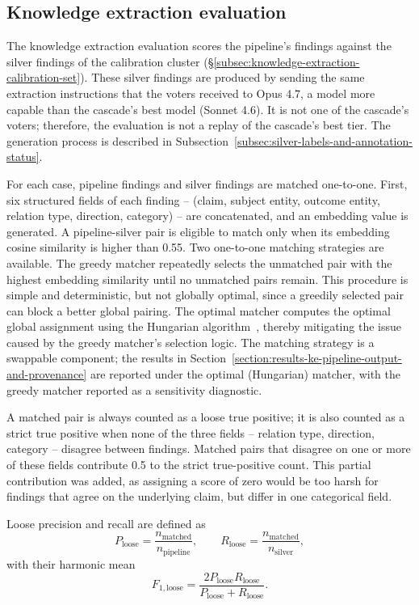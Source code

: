 \subsection{Knowledge extraction evaluation}\label{subsec:eval-knowledge-extraction}

The knowledge extraction evaluation scores the pipeline's findings against the silver findings of the calibration cluster (§\ref{subsec:knowledge-extraction-calibration-set}). These silver findings are produced by sending the same extraction instructions that the voters received to Opus 4.7, a model more capable than the cascade's best model (Sonnet 4.6). It is not one of the cascade's voters; therefore, the evaluation is not a replay of the cascade's best tier. The generation process is described in Subsection~\ref{subsec:silver-labels-and-annotation-status}.

For each case, pipeline findings and silver findings are matched one-to-one. First, six structured fields of each finding -- (claim, subject entity, outcome entity, relation type, direction, category) -- are concatenated, and an embedding value is generated. A pipeline-silver pair is eligible to match only when its embedding cosine similarity is higher than 0.55. Two one-to-one matching strategies are available. The greedy matcher repeatedly selects the unmatched pair with the highest embedding similarity until no unmatched pairs remain. This procedure is simple and deterministic, but not globally optimal, since a greedily selected pair can block a better global pairing. The optimal matcher computes the optimal global assignment using the Hungarian algorithm~\parencite{kuhn1955hungarianmethodassignment}, thereby mitigating the issue caused by the greedy matcher's selection logic. The matching strategy is a swappable component; the results in Section~\ref{section:results-ke-pipeline-output-and-provenance} are reported under the optimal (Hungarian) matcher, with the greedy matcher reported as a sensitivity diagnostic.

A matched pair is always counted as a loose true positive; it is also counted as a strict true positive when none of the three fields -- relation type, direction, category -- disagree between findings. Matched pairs that disagree on one or more of these fields contribute 0.5 to the strict true-positive count. This partial contribution was added, as assigning a score of zero would be too harsh for findings that agree on the underlying claim, but differ in one categorical field.

Loose precision and recall are defined as
\begin{equation}
    P_{\mathrm{loose}} = \frac{n_{\mathrm{matched}}}{n_{\mathrm{pipeline}}},
    \qquad
    R_{\mathrm{loose}} = \frac{n_{\mathrm{matched}}}{n_{\mathrm{silver}}},
\end{equation}
with their harmonic mean
\begin{equation}
    F_{1,\mathrm{loose}} = \frac{2P_{\mathrm{loose}}R_{\mathrm{loose}}} {P_{\mathrm{loose}} + R_{\mathrm{loose}}}.
\end{equation}

